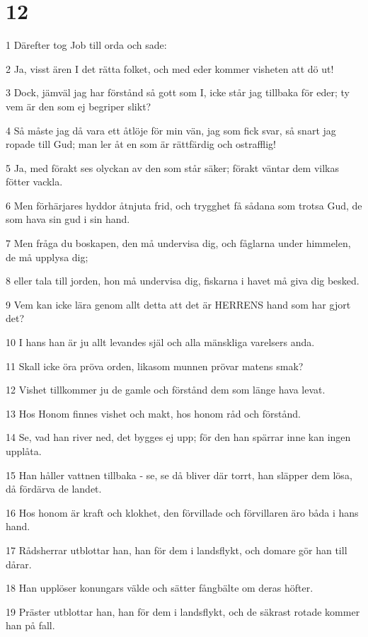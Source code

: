 \chapter{12}

\par 1 Därefter tog Job till orda och sade:
\par 2 Ja, visst ären I det rätta folket, och med eder kommer visheten att dö ut!
\par 3 Dock, jämväl jag har förstånd så gott som I, icke står jag tillbaka för eder; ty vem är den som ej begriper slikt?
\par 4 Så måste jag då vara ett åtlöje för min vän, jag som fick svar, så snart jag ropade till Gud; man ler åt en som är rättfärdig och ostrafflig!
\par 5 Ja, med förakt ses olyckan av den som står säker; förakt väntar dem vilkas fötter vackla.
\par 6 Men förhärjares hyddor åtnjuta frid, och trygghet få sådana som trotsa Gud, de som hava sin gud i sin hand.
\par 7 Men fråga du boskapen, den må undervisa dig, och fåglarna under himmelen, de må upplysa dig;
\par 8 eller tala till jorden, hon må undervisa dig, fiskarna i havet må giva dig besked.
\par 9 Vem kan icke lära genom allt detta att det är HERRENS hand som har gjort det?
\par 10 I hans han är ju allt levandes själ och alla mänskliga varelsers anda.
\par 11 Skall icke öra pröva orden, likasom munnen prövar matens smak?
\par 12 Vishet tillkommer ju de gamle och förstånd dem som länge hava levat.
\par 13 Hos Honom finnes vishet och makt, hos honom råd och förstånd.
\par 14 Se, vad han river ned, det bygges ej upp; för den han spärrar inne kan ingen upplåta.
\par 15 Han håller vattnen tillbaka - se, se då bliver där torrt, han släpper dem lösa, då fördärva de landet.
\par 16 Hos honom är kraft och klokhet, den förvillade och förvillaren äro båda i hans hand.
\par 17 Rådsherrar utblottar han, han för dem i landsflykt, och domare gör han till dårar.
\par 18 Han upplöser konungars välde och sätter fångbälte om deras höfter.
\par 19 Präster utblottar han, han för dem i landsflykt, och de säkrast rotade kommer han på fall.
